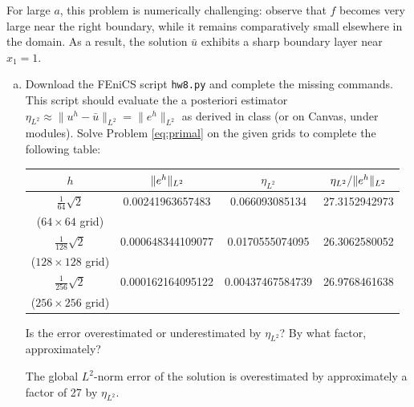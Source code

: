 For large $a$, this problem is numerically challenging: observe that $f$ becomes very large near the right boundary, while it remains comparatively small elsewhere in the domain. As a result, the solution $\bar{u}$ exhibits a sharp boundary layer near $x_1 = 1$.


\begin{enumerate}[(a)]
\item Download the \textsf{FEniCS} script \texttt{hw8.py} and complete the missing commands. This script should evaluate the a posteriori estimator $\eta_{L^2}\approx \lVert u^h - \bar{u} \rVert_{L^2} = \lVert e^h \rVert_{L^2}$ as derived in class (or on \textsf{Canvas}, under modules). Solve Problem \eqref{eq:primal} on the given grids to complete the following table:

\begin{center}
\begin{tabular}{cccc}
\toprule
$h$ & $\lVert e^h \rVert_{L^2}$ & $\eta_{L^2}$ & $\eta_{L^2} / \lVert e^h \rVert_{L^2}$\\
\toprule
$\frac{1}{64}\sqrt{2}$  & 0.00241963657483  & 0.066093085134   & 27.3152942973 \\
($64\times 64$ grid) \\
\midrule
$\frac{1}{128}\sqrt{2}$ & 0.000648344109077 & 0.0170555074095  & 26.3062580052 \\
($128\times 128$ grid)\\
\midrule
$\frac{1}{256}\sqrt{2}$ & 0.000162164095122 & 0.00437467584739 & 26.9768461638 \\
($256\times 256$ grid)\\
\bottomrule
\end{tabular}
\end{center}
Is the error overestimated or underestimated by $\eta_{L^2}$? By what factor, approximately?

\begin{solution}

The global $L^2$-norm error of the solution is overestimated by approximately a factor of 27 by $\eta_{L^2}$.

\end{solution}

\vspace{3em}


\end{enumerate}
